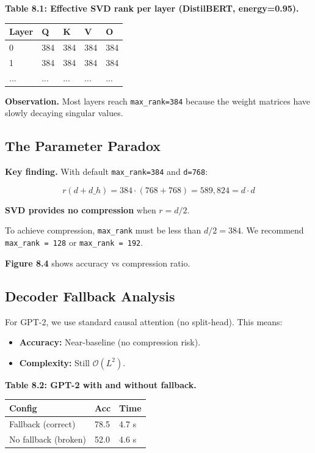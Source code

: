 \textbf{Table 8.1: Effective SVD rank per layer (DistilBERT, energy=0.95).}

\begin{table}[H]
\centering
\small
\begin{tabular}{lllll}
\toprule
\textbf{Layer} & \textbf{Q} & \textbf{K} & \textbf{V} & \textbf{O} \\
\midrule
0 & 384 & 384 & 384 & 384 \\
1 & 384 & 384 & 384 & 384 \\
... & ... & ... & ... & ... \\
\bottomrule
\end{tabular}
\end{table}

\textbf{Observation.} Most layers reach \texttt{max\_rank=384} because the weight 
matrices have slowly decaying singular values.

\subsection{The Parameter Paradox}

\textbf{Key finding.} With default \texttt{max\_rank=384} and \texttt{d=768}:

\[
r(d + d\_h) = 384 \cdot (768 + 768) = 589,824 = d \cdot d
\]

\textbf{SVD provides no compression} when $r = d/2$.

To achieve compression, \texttt{max\_rank} must be less than $d/2 = 384$. We 
recommend \texttt{max\_rank = 128} or \texttt{max\_rank = 192}.

\textbf{Figure 8.4} shows accuracy vs compression ratio.

\subsection{Decoder Fallback Analysis}

For GPT-2, we use standard causal attention (no split-head). This means:

\begin{itemize}
\item \textbf{Accuracy:} Near-baseline (no compression risk).
\item \textbf{Complexity:} Still $\mathcal{O}(L^2)$.

\end{itemize}
\textbf{Table 8.2: GPT-2 with and without fallback.}

\begin{table}[H]
\centering
\small
\begin{tabular}{lll}
\toprule
\textbf{Config} & \textbf{Acc} & \textbf{Time} \\
\midrule
Fallback (correct) & 78.5 & 4.7 s \\
No fallback (broken) & 52.0 & 4.6 s \\
\bottomrule
\end{tabular}
\end{table}

